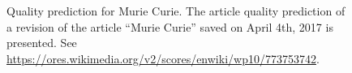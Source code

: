 \begin{figure}[htbp]
	\caption{Quality prediction for Murie Curie. The article quality prediction of a revision of the article ``Murie Curie'' saved on April 4th, 2017 is presented.  See \url{https://ores.wikimedia.org/v2/scores/enwiki/wp10/773753742}. }
	\label{fig:murie_curie_prediction}
\end{figure}
